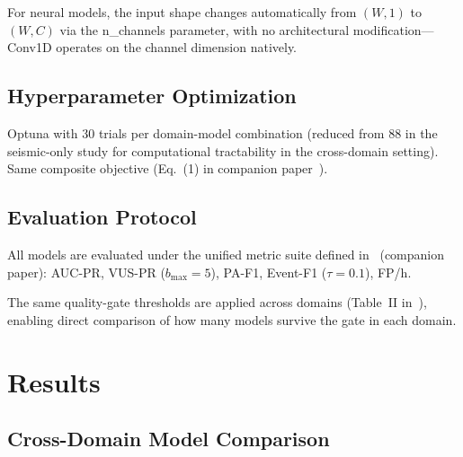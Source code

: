 \documentclass[conference]{IEEEtran}
\def\texttt#1{#1}%
\begin{document}
For neural models, the input shape changes automatically from
$(W, 1)$ to $(W, C)$ via the \texttt{n\_channels} parameter,
with no architectural modification---\texttt{Conv1D} operates on
the channel dimension natively.

\subsection{Hyperparameter Optimization}

Optuna with 30 trials per domain-model combination (reduced from 88 in
the seismic-only study for computational tractability in the cross-domain
setting).
Same composite objective (Eq.~(1) in companion paper~\cite{artigo1}).

\subsection{Evaluation Protocol}

All models are evaluated under the unified metric suite defined
in~\cite{artigo2} (companion paper):
AUC-PR, VUS-PR ($b_{\max} = 5$), PA-F1, Event-F1 ($\tau=0.1$), FP/h.

The same quality-gate thresholds are applied across domains
(Table~II in~\cite{artigo2}), enabling direct comparison of
how many models survive the gate in each domain.

\section{Results}
\label{sec:results}

\subsection{Cross-Domain Model Comparison}
\end{document}
